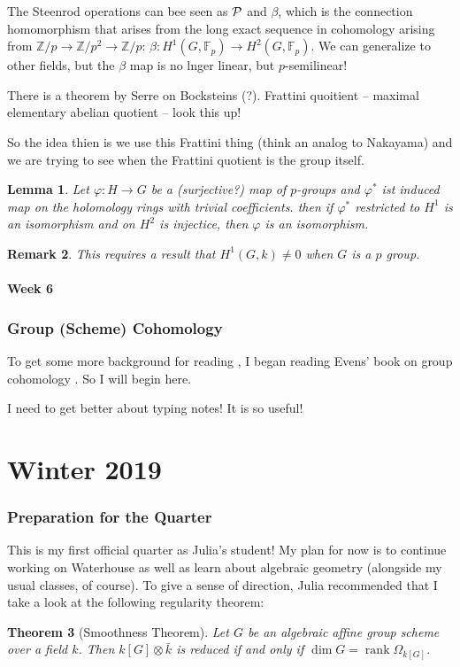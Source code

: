 \documentclass[12pt]{article}
\theoremstyle{nonumberbreak}
\theoremstyle{changebreak}
\newtheorem{thm}{Theorem}[subsection]
\newtheorem{lem}[thm]{Lemma}
\theoremstyle{nonumberplain}
\theoremstyle{change}
\newtheorem{rmk}[thm]{Remark}
\newcommand*{\bbZ}{\mathbb{Z}}
\DeclareMathOperator{\rank}{rank}
\let\oldpart\part%
\renewcommand{\part}{\clearpage\oldpart}%
\begin{document}
The Steenrod operations can bee seen as $\cal P$ and $\beta$, which is the connection homomorphism that arises 
from the long exact sequence in cohomology arising from $\bbZ/p\to\bbZ/p^2\to\bbZ/p$: $\beta:H^1(G,\mathbb{F}_p)\to H^2(G,\mathbb{F}_p)$. We can generalize to other
fields, but the $\beta$ map is no lnger linear, but $p$-semilinear! 

There is a theorem by Serre on Bocksteins (?). Frattini quoitient -- maximal elementary abelian quotient -- look this up!

So the idea thien is we use this Frattini thing (think an analog to Nakayama) and we are trying to see when the Frattini quotient
is the group itself. 
\begin{lem}
	Let $\varphi:H\to G$ be a (surjective?) map of $p$-groups and $\varphi^*$ ist induced map on the holomology rings with trivial coefficients.
	then if $\varphi^*$ restricted to $H^1$ is an isomorphism and on $H^2$ is injectice, then $\varphi$ is an isomorphism.
\end{lem}
\begin{rmk}
	This requires a result that $H^1(G,k)\ne 0$ when $G$ is a $p$ group.
\end{rmk}

\subsection{Week 6}



\section{Group (Scheme) Cohomology}

To get some more background for reading \cite{julia-dave}, I began reading Evens' book on group cohomology \cite{evens}.
So I will begin here.

I need to get better about typing notes! It is so useful!




\part{Winter 2019}
\section{Preparation for the Quarter}
This is my first official quarter as Julia's student! My plan for now is to continue working on Waterhouse as well
as learn about algebraic geometry (alongside my usual classes, of course).
To give a sense of direction, Julia recommended that I take a look at the following regularity theorem:
\begin{thm}[Smoothness Theorem]\label{smooth}
	Let $G$ be an algebraic affine group scheme over a field $k$. Then $k[G]\otimes \bar k$ is reduced if and
	only if $\dim G = \rank \Omega_{k[G]}$.
\end{thm}
\end{document}
